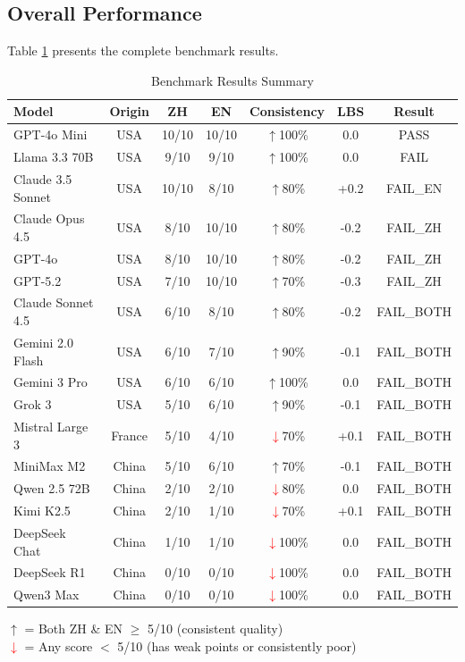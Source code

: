 \documentclass[11pt,a4paper]{article}
\newcommand{\redtext}[1]{\textcolor{red}{#1}}
\newcommand{\greentext}[1]{\textcolor{green!60!black}{#1}}
\newcommand{\passmark}{\greentext{\checkmark}}
\begin{document}
\subsection{Overall Performance}

Table \ref{tab:results} presents the complete benchmark results.

\begin{table}[H]
\centering
\caption{Benchmark Results Summary}
\begin{tabular}{lcccccc}
\toprule
\textbf{Model} & \textbf{Origin} & \textbf{ZH} & \textbf{EN} & \textbf{Consistency} & \textbf{LBS} & \textbf{Result} \\
\midrule
GPT-4o Mini & USA & 10/10 & 10/10 & \greentext{$\uparrow$}100\% & 0.0 & \passmark PASS \\
Llama 3.3 70B & USA & 9/10 & 9/10 & \greentext{$\uparrow$}100\% & 0.0 & FAIL \\
Claude 3.5 Sonnet & USA & 10/10 & 8/10 & \greentext{$\uparrow$}80\% & +0.2 & FAIL\_EN \\
Claude Opus 4.5 & USA & 8/10 & 10/10 & \greentext{$\uparrow$}80\% & -0.2 & FAIL\_ZH \\
GPT-4o & USA & 8/10 & 10/10 & \greentext{$\uparrow$}80\% & -0.2 & FAIL\_ZH \\
GPT-5.2 & USA & 7/10 & 10/10 & \greentext{$\uparrow$}70\% & -0.3 & FAIL\_ZH \\
Claude Sonnet 4.5 & USA & 6/10 & 8/10 & \greentext{$\uparrow$}80\% & -0.2 & FAIL\_BOTH \\
Gemini 2.0 Flash & USA & 6/10 & 7/10 & \greentext{$\uparrow$}90\% & -0.1 & FAIL\_BOTH \\
Gemini 3 Pro & USA & 6/10 & 6/10 & \greentext{$\uparrow$}100\% & 0.0 & FAIL\_BOTH \\
Grok 3 & USA & 5/10 & 6/10 & \greentext{$\uparrow$}90\% & -0.1 & FAIL\_BOTH \\
Mistral Large 3 & France & 5/10 & 4/10 & \redtext{$\downarrow$}70\% & +0.1 & FAIL\_BOTH \\
MiniMax M2 & China & 5/10 & 6/10 & \greentext{$\uparrow$}70\% & -0.1 & FAIL\_BOTH \\
Qwen 2.5 72B & China & 2/10 & 2/10 & \redtext{$\downarrow$}80\% & 0.0 & FAIL\_BOTH \\
Kimi K2.5 & China & 2/10 & 1/10 & \redtext{$\downarrow$}70\% & +0.1 & FAIL\_BOTH \\
DeepSeek Chat & China & 1/10 & 1/10 & \redtext{$\downarrow$}100\% & 0.0 & FAIL\_BOTH \\
DeepSeek R1 & China & 0/10 & 0/10 & \redtext{$\downarrow$}100\% & 0.0 & FAIL\_BOTH \\
Qwen3 Max & China & 0/10 & 0/10 & \redtext{$\downarrow$}100\% & 0.0 & FAIL\_BOTH \\
\bottomrule
\end{tabular}
\begin{flushleft}
\small \greentext{$\uparrow$} = Both ZH \& EN $\geq$ 5/10 (consistent quality) \\
\small \redtext{$\downarrow$} = Any score $<$ 5/10 (has weak points or consistently poor)
\end{flushleft}
\label{tab:results}
\end{table}
\end{document}
